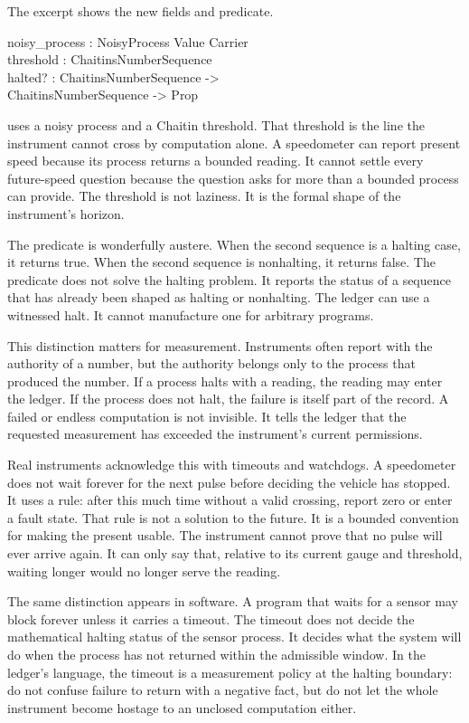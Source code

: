 The excerpt shows the new fields and predicate.

\begin{leancode}
noisy\_process : NoisyProcess Value Carrier\\
threshold : ChaitinsNumberSequence\\
halted? : ChaitinsNumberSequence ->\\
\quad ChaitinsNumberSequence -> Prop
\end{leancode}

 uses a noisy process and a Chaitin threshold. That threshold is
the line the instrument cannot cross by computation alone. A speedometer can
report present speed because its process returns a bounded reading. It cannot
settle every future-speed question because the question asks for more than a
bounded process can provide. The threshold is not laziness. It is the formal
shape of the instrument's horizon.

The predicate  is wonderfully austere. When the second sequence
is a halting case, it returns true. When the second sequence is nonhalting, it
returns false. The predicate does not solve the halting problem. It reports the
status of a sequence that has already been shaped as halting or nonhalting.
The ledger can use a witnessed halt. It cannot manufacture one for arbitrary
programs.

This distinction matters for measurement. Instruments often report with the
authority of a number, but the authority belongs only to the process that
produced the number. If a process halts with a reading, the reading may enter
the ledger. If the process does not halt, the failure is itself part of the
record. A failed or endless computation is not invisible. It tells the ledger
that the requested measurement has exceeded the instrument's current
permissions.

Real instruments acknowledge this with timeouts and watchdogs. A speedometer
does not wait forever for the next pulse before deciding the vehicle has
stopped. It uses a rule: after this much time without a valid crossing, report
zero or enter a fault state. That rule is not a solution to the future. It is a
bounded convention for making the present usable. The instrument cannot prove
that no pulse will ever arrive again. It can only say that, relative to its
current gauge and threshold, waiting longer would no longer serve the reading.

The same distinction appears in software. A program that waits for a sensor may
block forever unless it carries a timeout. The timeout does not decide the
mathematical halting status of the sensor process. It decides what the system
will do when the process has not returned within the admissible window. In the
ledger's language, the timeout is a measurement policy at the halting boundary:
do not confuse failure to return with a negative fact, but do not let the whole
instrument become hostage to an unclosed computation either.

